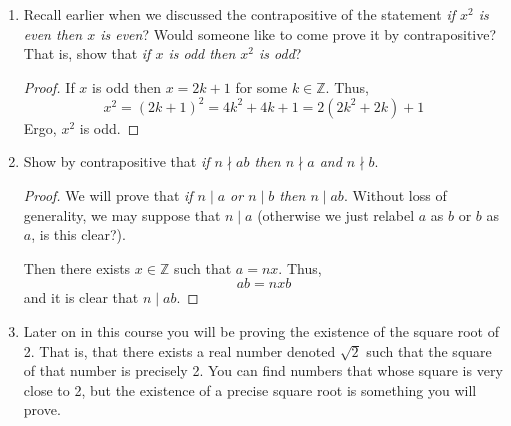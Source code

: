 \documentclass[12pt, reqno]{article}
\numberwithin{equation}{section}
\theoremstyle{definition}
\theoremstyle{remark}
\newcommand{\ZZ}{\mathbb{Z}}
\begin{document}
\begin{enumerate}[leftmargin=*]
\begin{proof}
		      We have
		      \[
			      n^2 - 1 = 4k^2 + 4k = 4(k)(k+1)
		      \]
		      Since one of $k$ or $k+1$ is even, we see that $n^2 -1$ will be divisible by 8. We rigorously write out this thought process.

		      \textbf{Case 1}: The number $k$ is even. In this case, there exists $\ell \in \ZZ$ such that $k  = 2\ell$. Then
		      \[
			      n^2 -1= 4(k)(k+1) = 4(2\ell)(2\ell+1) = 8(\ell)(2\ell+1)
		      \]
		      Thus, $n^2-1$ is clearly divisible by 8.

		      \textbf{Case 2}: The number $k$ is odd. (Would someone like to try this on the board?) In this case, there exists $\ell \in \ZZ$ such that $k  = 2\ell + 1$. Then
		      \[
			      n^2 -1= 4(k)(k+1) = 4(2\ell + 1)(2\ell+2) = 8(2\ell + 1)(\ell+1)
		      \]
		      Thus, $n^2-1$ is clearly divisible by 8.
	      \end{proof}

	\item\label{evensquare} Recall earlier when we discussed the contrapositive of the statement \emph{if $x^2$ is even then $x$ is even}? Would someone like to come prove it by contrapositive? That is, show that \emph{if $x$ is odd then $x^2$ is odd}?
	      \begin{proof}
		      If $x$ is odd then $x = 2k + 1$ for some $k\in \ZZ$. Thus,
		      \[
			      x^2 = (2k+1)^2 = 4k^2 + 4k + 1 = 2(2k^2+2k) + 1
		      \]
		      Ergo, $x^2$ is odd.
	      \end{proof}
	\item Show by contrapositive that \emph{if $n\nmid ab$ then $n\nmid a$ and $n\nmid b$}.

	      \begin{proof}
		      We will prove that \emph{if $n\mid a$ or $n\mid b$ then $n\mid ab$}. Without loss of generality, we may suppose that $n \mid a$ (otherwise we just relabel $a$ as $b$ or $b$ as $a$, is this clear?).

		      Then there exists $x \in \ZZ$ such that $a = nx$. Thus,
		      \[
			      ab = nxb
		      \]
		      and it is clear that $n\mid ab$.
	      \end{proof}

	\item Later on in this course you will be proving the existence of the square root of 2. That is, that there exists a real number denoted $\sqrt{2}$ such that the square of that number is precisely 2. You can find numbers that whose square is very close to 2, but the existence of a precise square root is something you will prove.


\end{enumerate}
\end{document}
